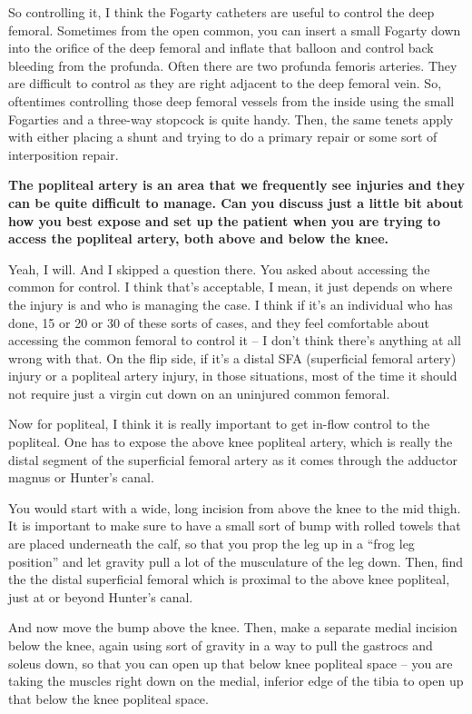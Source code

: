 \documentclass[
]{book}
\begin{document}
So controlling it, I think the Fogarty catheters are useful to control
the deep femoral. Sometimes from the open common, you can insert a small
Fogarty down into the orifice of the deep femoral and inflate that
balloon and control back bleeding from the profunda. Often there are two
profunda femoris arteries. They are difficult to control as they are
right adjacent to the deep femoral vein. So, oftentimes controlling
those deep femoral vessels from the inside using the small Fogarties and
a three-way stopcock is quite handy. Then, the same tenets apply with
either placing a shunt and trying to do a primary repair or some sort of
interposition repair.

\textbf{The popliteal artery is an area that we frequently see injuries and
they can be quite difficult to manage. Can you discuss just a little bit
about how you best expose and set up the patient when you are trying to
access the popliteal artery, both above and below the knee.}

Yeah, I will. And I skipped a question there. You asked about accessing
the common for control. I think that's acceptable, I mean, it just
depends on where the injury is and who is managing the case. I think if
it's an individual who has done, 15 or 20 or 30 of these sorts of cases,
and they feel comfortable about accessing the common femoral to control
it -- I don't think there's anything at all wrong with that. On the flip
side, if it's a distal SFA (superficial femoral artery) injury or a
popliteal artery injury, in those situations, most of the time it should
not require just a virgin cut down on an uninjured common femoral.

Now for popliteal, I think it is really important to get in-flow control
to the popliteal. One has to expose the above knee popliteal artery,
which is really the distal segment of the superficial femoral artery as
it comes through the adductor magnus or Hunter's canal.

You would start with a wide, long incision from above the knee to the
mid thigh. It is important to make sure to have a small sort of bump
with rolled towels that are placed underneath the calf, so that you prop
the leg up in a ``frog leg position'' and let gravity pull a lot of the
musculature of the leg down. Then, find the the distal superficial
femoral which is proximal to the above knee popliteal, just at or beyond
Hunter's canal.

And now move the bump above the knee. Then, make a separate medial
incision below the knee, again using sort of gravity in a way to pull
the gastrocs and soleus down, so that you can open up that below knee
popliteal space -- you are taking the muscles right down on the medial,
inferior edge of the tibia to open up that below the knee popliteal
space.
\end{document}
